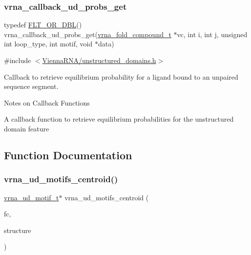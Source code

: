 \subsubsection{\texorpdfstring{vrna\+\_\+callback\+\_\+ud\+\_\+probs\+\_\+get}{vrna\_callback\_ud\_probs\_get}}
{\footnotesize\ttfamily typedef \hyperlink{group__data__structures_ga31125aeace516926bf7f251f759b6126}{F\+L\+T\+\_\+\+O\+R\+\_\+\+D\+BL}() vrna\+\_\+callback\+\_\+ud\+\_\+probs\+\_\+get(\hyperlink{group__fold__compound_ga1b0cef17fd40466cef5968eaeeff6166}{vrna\+\_\+fold\+\_\+compound\+\_\+t} $\ast$vc, int i, int j, unsigned int loop\+\_\+type, int motif, void $\ast$data)}



{\ttfamily \#include $<$\hyperlink{unstructured__domains_8h}{Vienna\+R\+N\+A/unstructured\+\_\+domains.\+h}$>$}



Callback to retrieve equilibrium probability for a ligand bound to an unpaired sequence segment. 

\begin{DoxyRefDesc}{Notes on Callback Functions}
\item[\hyperlink{callbacks__callbacks000011}{Notes on Callback Functions}]A callback function to retrieve equilibrium probabilities for the unstructured domain feature \end{DoxyRefDesc}


\subsection{Function Documentation}
\mbox{\label{group__domains__up_ga2039caedf194c5edec794866986d95ec}} 
\subsubsection{\texorpdfstring{vrna\+\_\+ud\+\_\+motifs\+\_\+centroid()}{vrna\_ud\_motifs\_centroid()}}
{\footnotesize\ttfamily \hyperlink{structvrna__unstructured__domain__motif__s}{vrna\+\_\+ud\+\_\+motif\+\_\+t}$\ast$ vrna\+\_\+ud\+\_\+motifs\+\_\+centroid (\begin{DoxyParamCaption}\item[{\hyperlink{group__fold__compound_ga1b0cef17fd40466cef5968eaeeff6166}{vrna\+\_\+fold\+\_\+compound\+\_\+t} $\ast$}]{fc,  }\item[{const char $\ast$}]{structure }\end{DoxyParamCaption})}



